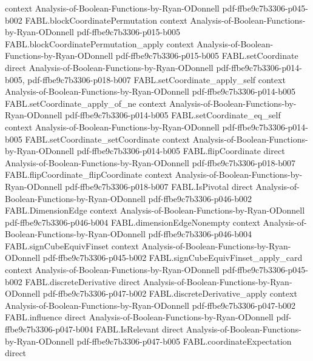 \begin{theorem}
  {context}
  {Analysis-of-Boolean-Functions-by-Ryan-ODonnell}
  {pdf-ffbe9c7b3306-p045-b002}
\proofstep
  {FABL.blockCoordinatePermutation}
  {context}
  {Analysis-of-Boolean-Functions-by-Ryan-ODonnell}
  {pdf-ffbe9c7b3306-p015-b005}
\proofstep
  {FABL.blockCoordinatePermutation_apply}
  {context}
  {Analysis-of-Boolean-Functions-by-Ryan-ODonnell}
  {pdf-ffbe9c7b3306-p015-b005}
\proofstep
  {FABL.setCoordinate}
  {direct}
  {Analysis-of-Boolean-Functions-by-Ryan-ODonnell}
  {pdf-ffbe9c7b3306-p014-b005,
    pdf-ffbe9c7b3306-p018-b007}
\proofstep
  {FABL.setCoordinate_apply_self}
  {context}
  {Analysis-of-Boolean-Functions-by-Ryan-ODonnell}
  {pdf-ffbe9c7b3306-p014-b005}
\proofstep
  {FABL.setCoordinate_apply_of_ne}
  {context}
  {Analysis-of-Boolean-Functions-by-Ryan-ODonnell}
  {pdf-ffbe9c7b3306-p014-b005}
\proofstep
  {FABL.setCoordinate_eq_self}
  {context}
  {Analysis-of-Boolean-Functions-by-Ryan-ODonnell}
  {pdf-ffbe9c7b3306-p014-b005}
\proofstep
  {FABL.setCoordinate_setCoordinate}
  {context}
  {Analysis-of-Boolean-Functions-by-Ryan-ODonnell}
  {pdf-ffbe9c7b3306-p014-b005}
\proofstep
  {FABL.flipCoordinate}
  {direct}
  {Analysis-of-Boolean-Functions-by-Ryan-ODonnell}
  {pdf-ffbe9c7b3306-p018-b007}
\proofstep
  {FABL.flipCoordinate_flipCoordinate}
  {context}
  {Analysis-of-Boolean-Functions-by-Ryan-ODonnell}
  {pdf-ffbe9c7b3306-p018-b007}
\proofstep
  {FABL.IsPivotal}
  {direct}
  {Analysis-of-Boolean-Functions-by-Ryan-ODonnell}
  {pdf-ffbe9c7b3306-p046-b002}
\proofstep
  {FABL.DimensionEdge}
  {context}
  {Analysis-of-Boolean-Functions-by-Ryan-ODonnell}
  {pdf-ffbe9c7b3306-p046-b004}
\proofstep
  {FABL.dimensionEdgeNonempty}
  {context}
  {Analysis-of-Boolean-Functions-by-Ryan-ODonnell}
  {pdf-ffbe9c7b3306-p046-b004}
\proofstep
  {FABL.signCubeEquivFinset}
  {context}
  {Analysis-of-Boolean-Functions-by-Ryan-ODonnell}
  {pdf-ffbe9c7b3306-p045-b002}
\proofstep
  {FABL.signCubeEquivFinset_apply_card}
  {context}
  {Analysis-of-Boolean-Functions-by-Ryan-ODonnell}
  {pdf-ffbe9c7b3306-p045-b002}
\proofstep
  {FABL.discreteDerivative}
  {direct}
  {Analysis-of-Boolean-Functions-by-Ryan-ODonnell}
  {pdf-ffbe9c7b3306-p047-b002}
\proofstep
  {FABL.discreteDerivative_apply}
  {context}
  {Analysis-of-Boolean-Functions-by-Ryan-ODonnell}
  {pdf-ffbe9c7b3306-p047-b002}
\proofstep
  {FABL.influence}
  {direct}
  {Analysis-of-Boolean-Functions-by-Ryan-ODonnell}
  {pdf-ffbe9c7b3306-p047-b004}
\proofstep
  {FABL.IsRelevant}
  {direct}
  {Analysis-of-Boolean-Functions-by-Ryan-ODonnell}
  {pdf-ffbe9c7b3306-p047-b005}
\proofstep
  {FABL.coordinateExpectation}
  {direct}

\end{theorem}
